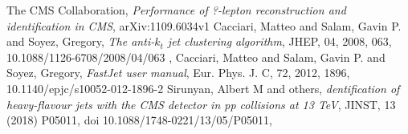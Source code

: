 \begin{thebibliography}{999}
		 The CMS Collaboration, \emph{Performance of ?-lepton reconstruction and identification in CMS}, arXiv:1109.6034v1
		 Cacciari, Matteo and Salam, Gavin P. and Soyez, Gregory, \emph{The anti-$k_t$ jet clustering algorithm}, JHEP, 04, 2008, 063, 10.1088/1126-6708/2008/04/063
		, Cacciari, Matteo and Salam, Gavin P. and Soyez, Gregory, \emph{FastJet user manual}, Eur. Phys. J. C, 72, 2012, 1896, 10.1140/epjc/s10052-012-1896-2
		 Sirunyan, Albert M and others, \emph{dentification of heavy-flavour jets with the CMS detector in pp collisions at 13 TeV}, JINST, 13 (2018) P05011, doi 10.1088/1748-0221/13/05/P05011,




\end{thebibliography}

